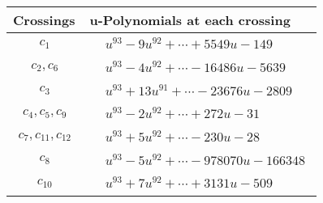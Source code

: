 \documentclass[1p]{elsarticle_modified}
\theoremstyle{definition}
\begin{document}
\begin{tabular}{m{50pt}|m{274pt}}
Crossings & \hspace{64pt}u-Polynomials at each crossing \\
\hline $$\begin{aligned}c_{1}\end{aligned}$$&$\begin{aligned}
&u^{93}-9 u^{92}+\cdots+5549 u-149
\end{aligned}$\\
\hline $$\begin{aligned}c_{2},c_{6}\end{aligned}$$&$\begin{aligned}
&u^{93}-4 u^{92}+\cdots-16486 u-5639
\end{aligned}$\\
\hline $$\begin{aligned}c_{3}\end{aligned}$$&$\begin{aligned}
&u^{93}+13 u^{91}+\cdots-23676 u-2809
\end{aligned}$\\
\hline $$\begin{aligned}c_{4},c_{5},c_{9}\end{aligned}$$&$\begin{aligned}
&u^{93}-2 u^{92}+\cdots+272 u-31
\end{aligned}$\\
\hline $$\begin{aligned}c_{7},c_{11},c_{12}\end{aligned}$$&$\begin{aligned}
&u^{93}+5 u^{92}+\cdots-230 u-28
\end{aligned}$\\
\hline $$\begin{aligned}c_{8}\end{aligned}$$&$\begin{aligned}
&u^{93}-5 u^{92}+\cdots-978070 u-166348
\end{aligned}$\\
\hline $$\begin{aligned}c_{10}\end{aligned}$$&$\begin{aligned}
&u^{93}+7 u^{92}+\cdots+3131 u-509
\end{aligned}$\\
\hline
\end{tabular}\\~\\
\newpage\renewcommand{\arraystretch}{1}
\end{document}
